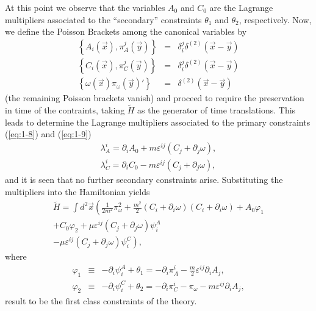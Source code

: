 \documentclass[a4paper,12pt]{article}
\newcommand{\eref}[1]{(\ref{#1})}
\newcommand{\vphi}{\varphi}
\renewcommand{\sup}[1]{^{(#1)}}
\newcommand{\dxy}{\delta\sup 2(\vec x-\vec y)}
\begin{document}
At this point we observe that the variables $A_0$ and $C_0$ are
the Lagrange multipliers associated to the ``secondary''
constraints $\theta_1$ and $\theta_2$, respectively. Now, we
define the Poisson Brackets among the canonical variables by
\begin{eqnarray}
   \label{eq:1-16}
   \left\{A_i(\vec x),\pi^j_A(\vec y)\right\}&=&\delta_i^j\dxy\\
   \left\{C_i(\vec x),\pi^j_C(\vec y)\right\}&=&\delta_i^j\dxy\\
   \left\{\omega(\vec x)\pi_\omega(\vec y)'\right\}&=&\dxy
\end{eqnarray}
(the remaining Poisson brackets vanish) and proceed to require the preservation
in time of the contraints, taking $\tilde H$ as the generator of time
translations. This leads to determine the Lagrange multipliers associated
to the primary constraints \eref{eq:1-8} and \eref{eq:1-9}
\begin{eqnarray}
   \label{eq:1-17}
   \lambda_A^i=\partial_iA_0+m\varepsilon^{ij}(C_j+\partial_j\omega),\\
   \lambda_C^i=\partial_iC_0-m\varepsilon^{ij}(C_j+\partial_j\omega),
\end{eqnarray}
and it is seen that no further secondary constraints arise. Substituting
the multipliers into the Hamiltonian yields
\begin{eqnarray}
   \label{eq:1-19}
   \tilde H =\int d^2\vec x\left(\frac1{2m^2}{\pi_{\omega}^2}+
\frac{m^2}{2}(C_i+\partial_i\omega)(C_i+\partial_i\omega)+
A_0\vphi_1\right.\nonumber\\
+C_0\vphi_2+\mu\varepsilon^{ij}(C_j+\partial_j\omega)\psi_i^A\nonumber\\
\left.-\mu\varepsilon^{ij}(C_j+\partial_j\omega)\psi_i^C\right),
\end{eqnarray}
where
\begin{eqnarray}
   \label{eq:1-20}
   \vphi_1&\equiv&-\partial_i\psi_i^A+\theta_1=
-\partial_i\pi^i_A-\frac m{2}\varepsilon^{ij}\partial_iA_j,\nonumber\\
\vphi_2&\equiv&-\partial_i\psi_i^C+\theta_2=
-\partial_i\pi^i_C-\pi_{\omega}-m\varepsilon^{ij}\partial_iA_j,
\end{eqnarray}
result to be the first class constraints of the theory.
\end{document}
